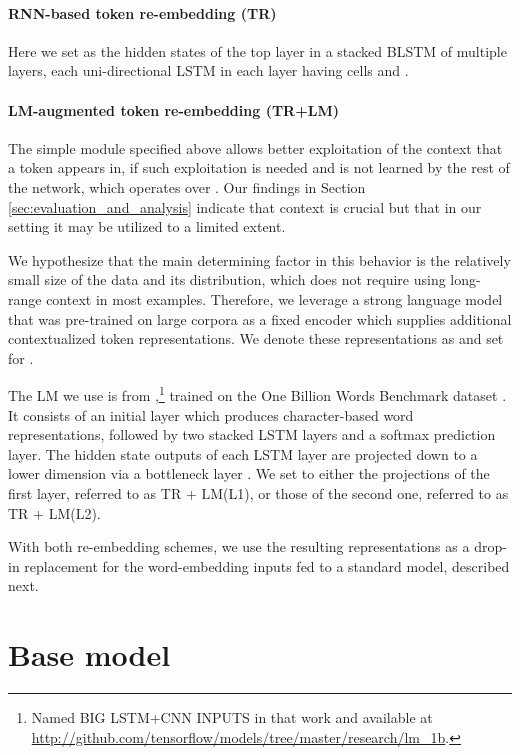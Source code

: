 \documentclass[11pt,a4paper]{article}
\newcommand{\lstm}{\textsc{LSTM}}
\newcommand{\bilstm}{\textsc{B\normalfont{i}LSTM}}
\newcommand{\tr}{\textsc{TR}}
\newcommand{\trLmLi}{\tr{} + LM(L1)}
\newcommand{\trLmLii}{\tr{} + LM(L2)}
\begin{document}
\paragraph{RNN-based token re-embedding \small{(TR)}}
Here we set  as the hidden states of the top layer in a stacked \bilstm{} of multiple layers, each uni-directional \lstm{} in each layer having  cells and .

\paragraph{LM-augmented token re-embedding \small{(TR+LM)}}
The simple module specified above allows better exploitation of the context that a token appears in, if such exploitation is needed and is not learned by the rest of the network, which operates over . 
Our findings in Section \ref{sec:evaluation_and_analysis} indicate that context is crucial but that in our setting it may be utilized to a limited extent.

We hypothesize that the main determining factor in this behavior is the relatively small size of the data and its distribution, which does not require using long-range context in most examples. Therefore, we leverage a strong language model that was pre-trained on large corpora as a fixed encoder which supplies additional contextualized token representations. We denote these representations as  and set  for .

The LM we use is from \citet{jozefowicz2016},\footnote{Named \textsc{BIG LSTM+CNN INPUTS} in that work and available at \small{\url{http://github.com/tensorflow/models/tree/master/research/lm_1b}}.} trained on the One Billion Words Benchmark dataset \cite{DBLP:journals/corr/ChelbaMSGBK13}. It consists of an initial layer which produces character-based word representations, followed by two stacked \lstm{} layers and a softmax prediction layer. The hidden state outputs of each \lstm{} layer are projected down to a lower dimension via a bottleneck layer \cite{sak2014}. We set  to either the projections of the first layer, referred to as \trLmLi{}, or those of the second one, referred to as \trLmLii{}.

With both re-embedding schemes, we use the resulting representations  as a drop-in replacement for the word-embedding inputs fed to a standard model, described next.
 
\section{Base model}
\label{sec:base_model}
\end{document}

